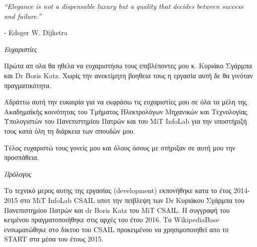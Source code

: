{  \vspace{3cm}
  \begin{flushleft}
    \textit{``Elegance is not a dispensable luxury but a quality that decides between success and failure.''}
  \end{flushleft}
  \begin{flushright}
    - Edsger W. Dijkstra
  \end{flushright}
  \afterpage{\blankpage}
  \newpage


  \thispagestyle{plain}
  \vspace*{1in}
  \begin{center}
    \begin{Large}
      \textit{Ευχαριστίες}
    \end{Large}
  \end{center}

  Πρώτα απ ολα θα ηθελα να ευχαριστήσω τους επιβλέποντες μου κ. Κυριάκο
  Σγάρμπα και Dr Boris Katz. Χωρίς την ανεκτίμητη βοηθεια τους η εργασία
  αυτή δε θα γινόταν πραγματικότητα.

  Αδράττω αυτή την ευκαιρία για να εκφράσω τις ευχαριστίες μου σε όλα τα
  μέλη της Ακαδημαϊκής κοινότητας του Τμήματος Ηλεκτρολόγων Μηχανικών
  και Τεχνολογίας Υπολογιστών του Πανεπιστημίου Πατρών και του MiT
  InfoLab για την υποστήριξή τους κατά όλη τη διάρκεια των σπουδών μου.


  Τέλος ευχαριστώ τους γονείς μου και όλους όσους με στήριξαν σε αυτή
  μου την προσπάθεια.

  \afterpage{\blankpage}
  \newpage

  \thispagestyle{plain}
  \vspace*{1in}
  \begin{center}
    \begin{Large}
      \textit{Πρόλογος}
    \end{Large}
  \end{center}

  Το τεχνικό μερος αυτης της εργασίας (development) εκπονήθηκε κατα το
  έτος 2014-2015 στο MiT InfoLab CSAIL υποτ την πείβλεψη των Dr
  Κυριάκου Σγάρμπα του Πανεπιστημίου Πατρών και dr Boris Katz του MiT
  CSAIL. Η συγγραφή του κειμένου πραγματοποιήθηκε στις αρχές του έτου
  2016. Το WikipediaBase ενσωματώθηκε στο δικτυο του CSAIL προκειμένου
  να χρησιμοποιηθεί απο το START στα μέσα του έτους 2015.

  \afterpage{\blankpage}


}
